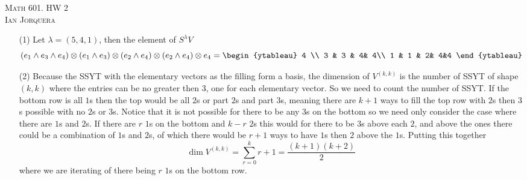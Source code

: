 \documentclass[12pt]{amsart}
\begin{document}
\begin{center}
    \textsc{Math 601. HW 2\\ Ian Jorquera}
\end{center}
\vspace{1em}
\begin{itemize}
    \item[(1)] %
    Let $\lambda=(5,4,1)$, then the element of $S^\lambda V$
    \[
        (e_1\wedge e_3 \wedge e_4)\otimes (e_1\wedge e_3)\otimes (e_2 \wedge e_4)\otimes (e_2 \wedge e_4)\otimes e_4 =
        \begin{ytableau}
            4 \\
            3 & 3 & 4& 4\\
            1 & 1 & 2& 4&4
            \end{ytableau}
    \]
    \item[(2)] %
    Because the SSYT with the elementary vectors as the filling form a basis, the dimension of 
    $V^{(k,k)}$ is the number of SSYT of shape $(k,k)$ where the entries can be no greater then $3$, one for 
    each elementary vector.
    So we need to count the number of SSYT. If the bottom row is all $1$s then the top would be all 
    $2$s or part $2$s and part $3$s, meaning there are $k+1$ ways to fill the top row with $2$s then 
    $3$s possible with no $2$s or $3$s. Notice that it is not possible for there to be any $3$s on the bottom
    so we need only consider the case where there are $1$s and $2$s. If there are $r$ $1$s on the bottom and 
    $k-r$ $2$s this would for there to be $3$s above each $2$, and above the ones there could be a combination 
    of $1$s and $2$s, of which there would be $r+1$ ways to have $1$s then $2$ above the $1$s. Putting this 
    together
    \[\dim V^{(k,k)} = \sum_{r=0}^k r+1=\frac{(k+1)(k+2)}{2}\]
    where we are iterating of there being $r$ $1$s on the bottom row.
    

\end{itemize}
\end{document}
